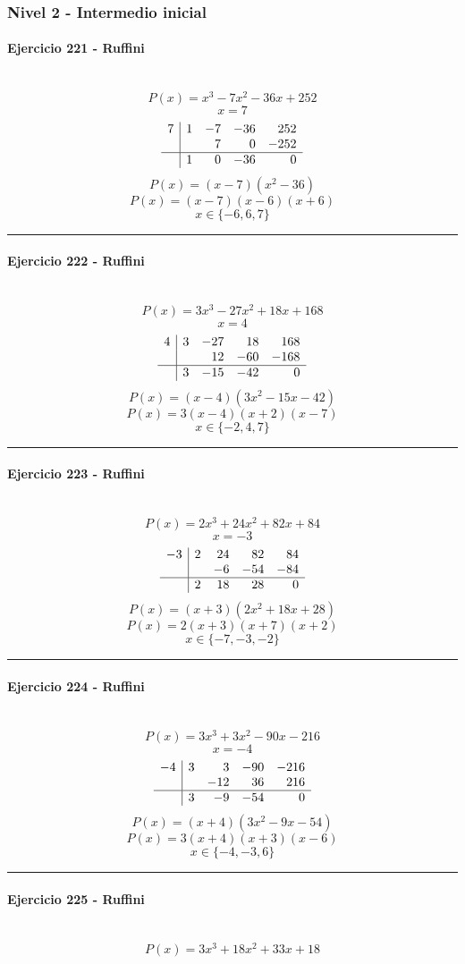 \documentclass[10pt,a4paper]{article}
\newcommand{\res}[1]{\paragraph{#1}\mbox{}\\[-1.2em]}
\begin{document}
\subsubsection*{Nivel 2 - Intermedio inicial}
\res{Ejercicio 221 - Ruffini}
\[ P(x)=x^{3} - 7 x^{2} - 36 x + 252 \]
\[ x=7 \]
\[\begin{array}{r|rrrr}7 & 1 & -7 & -36 & 252\\  &  & 7 & 0 & -252\\\hline  & 1 & 0 & -36 & 0\end{array}\]
\[ P(x)=(x-7)(x^{2} - 36) \]
\[ P(x)=(x-7)(x-6)(x+6) \]
\[ \boxed{x\in\{-6,6,7\}} \]
\vspace{1mm}\hrule\vspace{2mm}
\res{Ejercicio 222 - Ruffini}
\[ P(x)=3 x^{3} - 27 x^{2} + 18 x + 168 \]
\[ x=4 \]
\[\begin{array}{r|rrrr}4 & 3 & -27 & 18 & 168\\  &  & 12 & -60 & -168\\\hline  & 3 & -15 & -42 & 0\end{array}\]
\[ P(x)=(x-4)(3 x^{2} - 15 x - 42) \]
\[ P(x)=3(x-4)(x+2)(x-7) \]
\[ \boxed{x\in\{-2,4,7\}} \]
\vspace{1mm}\hrule\vspace{2mm}
\res{Ejercicio 223 - Ruffini}
\[ P(x)=2 x^{3} + 24 x^{2} + 82 x + 84 \]
\[ x=-3 \]
\[\begin{array}{r|rrrr}-3 & 2 & 24 & 82 & 84\\  &  & -6 & -54 & -84\\\hline  & 2 & 18 & 28 & 0\end{array}\]
\[ P(x)=(x+3)(2 x^{2} + 18 x + 28) \]
\[ P(x)=2(x+3)(x+7)(x+2) \]
\[ \boxed{x\in\{-7,-3,-2\}} \]
\vspace{1mm}\hrule\vspace{2mm}
\res{Ejercicio 224 - Ruffini}
\[ P(x)=3 x^{3} + 3 x^{2} - 90 x - 216 \]
\[ x=-4 \]
\[\begin{array}{r|rrrr}-4 & 3 & 3 & -90 & -216\\  &  & -12 & 36 & 216\\\hline  & 3 & -9 & -54 & 0\end{array}\]
\[ P(x)=(x+4)(3 x^{2} - 9 x - 54) \]
\[ P(x)=3(x+4)(x+3)(x-6) \]
\[ \boxed{x\in\{-4,-3,6\}} \]
\vspace{1mm}\hrule\vspace{2mm}
\res{Ejercicio 225 - Ruffini}
\[ P(x)=3 x^{3} + 18 x^{2} + 33 x + 18 \]
\end{document}
